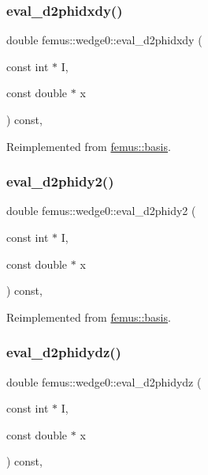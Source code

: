 \subsubsection{\texorpdfstring{eval\+\_\+d2phidxdy()}{eval\_d2phidxdy()}}
{\footnotesize\ttfamily double femus\+::wedge0\+::eval\+\_\+d2phidxdy (\begin{DoxyParamCaption}\item[{const int $\ast$}]{I,  }\item[{const double $\ast$}]{x }\end{DoxyParamCaption}) const\hspace{0.3cm}{\ttfamily [inline]}, {\ttfamily [virtual]}}



Reimplemented from \mbox{\hyperlink{classfemus_1_1basis_ac9feaf9e60421143db2a3708f3c7fa48}{femus\+::basis}}.

\mbox{\label{classfemus_1_1wedge0_a0e24923793d43732b2b3913c8c94a9dd}} 
\subsubsection{\texorpdfstring{eval\+\_\+d2phidy2()}{eval\_d2phidy2()}}
{\footnotesize\ttfamily double femus\+::wedge0\+::eval\+\_\+d2phidy2 (\begin{DoxyParamCaption}\item[{const int $\ast$}]{I,  }\item[{const double $\ast$}]{x }\end{DoxyParamCaption}) const\hspace{0.3cm}{\ttfamily [inline]}, {\ttfamily [virtual]}}



Reimplemented from \mbox{\hyperlink{classfemus_1_1basis_a0febb29fe4b32213ff8d6d428f7241cd}{femus\+::basis}}.

\mbox{\label{classfemus_1_1wedge0_a8b230fe06bdf7e089010f19ac81f6e64}} 
\subsubsection{\texorpdfstring{eval\+\_\+d2phidydz()}{eval\_d2phidydz()}}
{\footnotesize\ttfamily double femus\+::wedge0\+::eval\+\_\+d2phidydz (\begin{DoxyParamCaption}\item[{const int $\ast$}]{I,  }\item[{const double $\ast$}]{x }\end{DoxyParamCaption}) const\hspace{0.3cm}{\ttfamily [inline]}, {\ttfamily [virtual]}}



